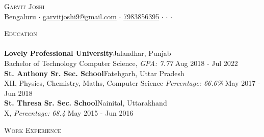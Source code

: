 \documentclass[a4paper]{article}
\newcommand{\lineunder} {
    \vspace*{-8pt} \\
    \hspace*{-18pt} \hrulefill \\
}
\newcommand{\header} [1] {
    {\hspace*{-18pt}\vspace*{6pt} \textsc{#1}}
    \vspace*{-6pt} \lineunder
}
\begin{document}
\vspace*{-40pt}

    

\vspace*{-10pt}
\begin{center}
	{\Huge \scshape {Garvit Joshi}}\\
	Bengaluru $\cdot$ \href{mailto:garvitjoshi9@gmail.com}{garvitjoshi9@gmail.com} $\cdot$ \href{tel:7983856395}{7983856395} $\cdot$ \href{https://garvit-joshi.github.io}{\faBriefcase} $\cdot$ \href{https://www.linkedin.com/in/garvitjoshi9/}{\faLinkedin} $\cdot$ \href{https://github.com/garvit-joshi/}{\faGithub}\\
\end{center}

\header{Education}
\textbf{Lovely Professional University}\hfill Jalandhar, Punjab\\
Bachelor of Technology Computer Science, \textit{GPA: 7.77} \hfill Aug 2018 - Jul 2022\\
\vspace{2mm}
\textbf{St. Anthony Sr. Sec. School}\hfill Fatehgarh, Uttar Pradesh\\
XII, Physics, Chemistry, Maths, Computer Science \textit{Percentage: 66.6\%} \hfill May 2017 - Jun 2018\\
\vspace{2mm}
\textbf{St. Thresa Sr. Sec. School}\hfill Nainital, Uttarakhand\\
X, \textit{Percentage: 68.4} \hfill May 2015 - Jun 2016\\
\vspace{2mm}

\header{Work Experience}
\vspace{1mm}
\end{document}

